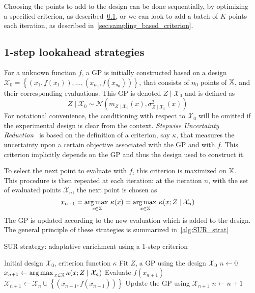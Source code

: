 \documentclass[../../Main_ManuscritThese.tex]{subfiles}
\begin{document}
Choosing the points to add to the design can be done sequentially, by optimizing a specified criterion, as described~\cref{ssec:1stepSUR}, or we can look to add a batch of $K$ points each iteration, as described in~\cref{sec:sampling_based_criterion}.

\subsection{1-step lookahead strategies}
\label{ssec:1stepSUR}
For a unknown function $f$, a GP is initially constructed based on a design $\mathcal{X}_0 = \left\{\left(x_1,f(x_1)\right), \dots, \left(x_{n_0}, f(x_{n_0})\right)\right\}$, that consists of $n_0$ points of $\mathbb{X}$, and their corresponding evaluations. This GP is denoted $Z \mid \mathcal{X}_0$ and is defined as
\begin{equation}
  \label{eq:ZgivenXGP}
  Z\mid \mathcal{X}_0 \sim \mathcal{N}(m_{Z\mid\mathcal{X}_0}(x),\sigma^2_{Z\mid\mathcal{X}_0}(x))
\end{equation}
For notational convenience, the conditioning with respect to $\mathcal{X}_0$ will be omitted if the experimental design is clear from the context.
\emph{Stepwise Uncertainty Reduction}~\cite{villemonteix_informational_2006} is based on the definition of a criterion, say $\kappa$, that measures the uncertainty upon a certain objective associated with the GP and with $f$. This criterion implicitly depends on the GP and thus the design used to construct it.

To select the next point to evaluate with $f$, this criterion is maximized on $\mathbb{X}$.
This procedure is then repeated at each iteration: at the iteration $n$, with the set of evaluated points $\mathcal{X}_n$, the next point is chosen as
\begin{equation}
  x_{n+1} = \operatorname*{arg\,max \,}_{x\in\mathbb{X}} \kappa(x) = \operatorname*{arg\,max \,}_{x\in\mathbb{X}} \kappa(x; Z \mid \mathcal{X}_n)
\end{equation}
The GP is updated according to the new evaluation which is added to the design. The general principle of these strategies is summarized in~\cref{alg:SUR_strat}

\begin{algorithm}
  \caption{\label{alg:SUR_strat} SUR strategy: adaptative enrichment using a 1-step criterion}
\begin{algorithmic}
\REQUIRE Initial design $\mathcal{X}_0$, criterion function $\kappa$
\STATE Fit $Z$, a GP using the design $\mathcal{X}_0$
\STATE $n \leftarrow 0$
\STATE $x_{n+1} \leftarrow \operatorname*{arg\,max \,}_{x \in \mathbb{X}} \kappa(x; Z \mid \mathcal{X}_{n})$
\STATE Evaluate $f(x_{n+1})$
\STATE $\mathcal{X}_{n+1} \leftarrow \mathcal{X}_n \cup \left\{\left(x_{n+1}, f(x_{n+1})\right)\right\}$
\STATE Update the GP using $\mathcal{X}_{n+1}$
\STATE $n \leftarrow n + 1$
\ENDWHILE
\end{algorithmic}
\end{algorithm}
\end{document}
